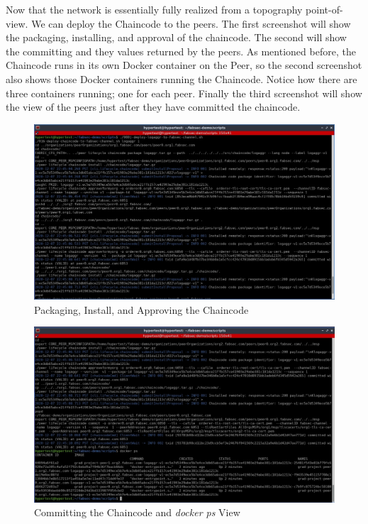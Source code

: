 	\newpage
	\hspace{10mm}Now that the network is essentially fully realized from a topography point-of-view. We can deploy the Chaincode to the peers. The first screenshot will show the packaging, installing, and approval of the chaincode. The second will show the committing and they values returned by the peers. As mentioned before, the Chaincode runs in its own Docker container on the Peer, so the second screenshot also shows those Docker containers running the Chaincode. Notice how there are three containers running; one for each peer. Finally the third screenshot will show the view of the peers just after they have committed the chaincode.
	
		\begin{figure}[H]
		\includegraphics[width=\textwidth]{./fabsec-report-network-flow/network-flow-12.jpg}
		\caption{Packaging, Install, and Approving the Chaincode}
		\end{figure}
		
		\begin{figure}[H]
		\includegraphics[width=.9\textwidth]{./fabsec-report-network-flow/network-flow-13.jpg}
		\centering
		\caption{Committing the Chaincode and \textit{docker ps} View}
		\end{figure}
		

